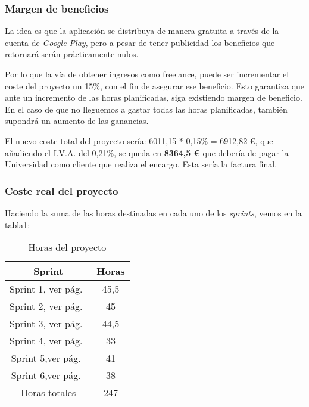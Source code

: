 \subsubsection{Margen de beneficios}
La idea es que la aplicación se distribuya de manera gratuita a través de la cuenta de \emph{Google Play}, pero a pesar de tener publicidad los beneficios que retornará serán prácticamente nulos.

Por lo que la vía de obtener ingresos como freelance, puede ser incrementar el coste del proyecto un 15\%, con el fin de asegurar ese beneficio. Esto garantiza que ante un incremento de las horas planificadas, siga existiendo margen de beneficio. En el caso de que no lleguemos a gastar todas las horas planificadas, también supondrá un aumento de las ganancias.

El nuevo coste total del proyecto sería: 6011,15 * 0,15\% = 6912,82  €, que añadiendo el I.V.A. del 0,21\%, se queda en \textbf{8364,5 €} que debería de pagar la Universidad como cliente que realiza el encargo. Esta sería la factura final.

\subsubsection{Coste real del proyecto}
Haciendo la suma de las horas destinadas en cada uno de los \emph{sprints}, vemos en la tabla\ref{table:horas}:

\begin{table}[H]
	\begin{center}
		\begin{tabular}{cc}
			\hline
			Sprint                        & Horas   	\\ \hline
			Sprint 1, ver pág.~\pageref{sprint-1-220620---260620}					    & 45,5     		\\
			Sprint 2, ver pág.~\pageref{sprint-1-270620---010720}					    & 45    		\\
			Sprint 3, ver pág.~\pageref{sprint-3-020720---070720}					    & 44,5  		\\
			Sprint 4, ver pág.~\pageref{sprint-4-070720---100720}					    & 33     		\\
			Sprint 5,ver pág.~\pageref{sprint-5-11072020---15072020}	& 41     			    		\\
			Sprint 6,ver pág.~\pageref{sprint-6-16072020---20072020}					    & 38    		\\  \hline
			Horas totales            	 		& 247			\\ \hline
		\end{tabular}
		\caption{Horas del proyecto}
		\label{table:horas}
	\end{center}
\end{table}


